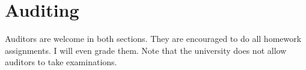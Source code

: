 
\section*{Auditing}

Auditors are welcome in both sections. They are encouraged to do all homework assignments. I will even grade them. Note that the university does not allow auditors to take examinations.